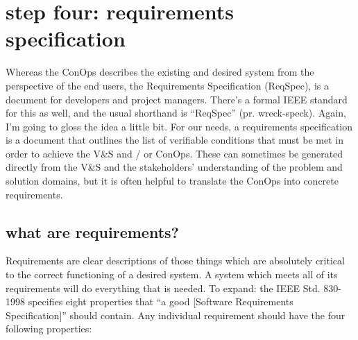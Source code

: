 \documentclass[12pt,oneside]{book}
\begin{document}
\newpage
{}
\section*{step four: requirements specification}

Whereas the ConOps describes the existing and desired system from the perspective of the end users, the Requirements Specification (ReqSpec), is a document for developers and project managers. There's a formal IEEE standard for this as well, and the usual shorthand is ``ReqSpec'' (pr. wreck-speck). Again, I'm going to gloss the idea a little bit. For our needs, a requirements specification is a document that outlines the list of verifiable conditions that must be met in order to achieve the V\&S and / or ConOps. These can sometimes be generated directly from the V\&S and the stakeholders' understanding of the problem and solution domains, but it is often helpful to translate the ConOps into concrete requirements.

\subsection*{what are requirements?}

Requirements are clear descriptions of those things which are absolutely critical to the correct functioning of a desired system. A system which meets all of its requirements will do everything that is needed. To expand: the IEEE Std. 830-1998 specifies eight properties that ``a good [Software Requirements Specification]'' should contain. Any individual requirement should have the four following properties:
\end{document}
